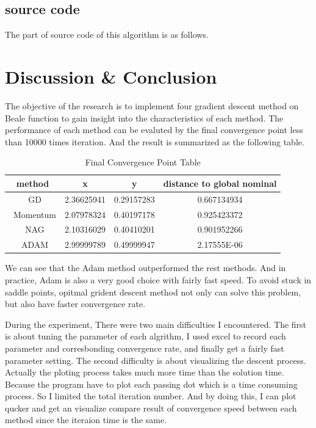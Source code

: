 \documentclass[aps,letterpaper,10pt]{article}
\begin{document}
    \subsection{source code}
    The part of source code of this algorithm is as follows.  \vspace{5mm}
    	
    	\vspace{3mm}


\newpage
\section{Discussion \& Conclusion}
The objective of the research is to implement four gradient descent method on Beale function to gain insight into the characteristics of each method. The performance of each method can be evaluted by the final convergence point less than 10000 times iteration. And the result is summarized as the following table.\vspace{3mm}

\begin{table}[htbp]
\begin{center}
  \begin{tabular}{|ccc|c|}
    \hline
    \textbf{method} & \textbf{x} & \textbf{y} & \textbf{distance to global nominal}  \\ \hline
    \ GD & 2.36625941  & 0.29157283 & 0.667134934 \\\hline
    \ Momentum & 2.07978324   & 0.40197178 & 0.925423372 \\\hline
    \ NAG & 2.10316029   & 0.40410201 & 0.901952266 \\\hline
    \ ADAM & 2.99999789   & 0.49999947 & 2.17555E-06 \\\hline
    \end{tabular}
\end{center}
\caption{Final Convergence Point Table}
\label{symbolic}
\end{table}

We can see that the Adam method outperformed the rest methods. And in practice, Adam is also a very good choice with fairly fast speed. To avoid stuck in saddle points, opitmal grident descent method not only can solve this problem, but also have faster convergence rate.\vspace{3mm}

During the experiment, There were two main difficulties I encountered. The first is about tuning the parameter of each algrithm, I used excel to record each parameter and corresbonding convergence rate, and finally get a fairly fast parameter setting. The second difficulty is about visualizing the descent process. Actually the ploting process takes much more time than the solution time. Because the program have to plot each passing dot which is a time consuming process. So I limited the total iteration number. And by doing this, I can plot qucker and get an visualize compare result of convergence speed between each method since the iteraion time is the same.\vspace{3mm}
\end{document}
